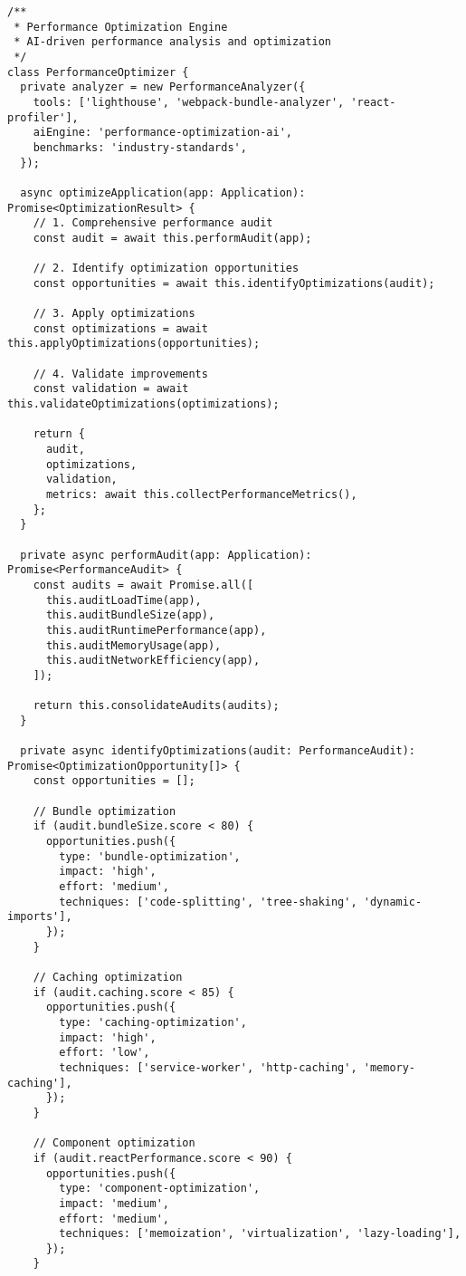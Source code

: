 \documentclass[11pt,a4paper]{article}
\begin{document}
\begin{lstlisting}[style=typescript, caption=AI-Powered Performance Optimization]
/**
 * Performance Optimization Engine
 * AI-driven performance analysis and optimization
 */
class PerformanceOptimizer {
  private analyzer = new PerformanceAnalyzer({
    tools: ['lighthouse', 'webpack-bundle-analyzer', 'react-profiler'],
    aiEngine: 'performance-optimization-ai',
    benchmarks: 'industry-standards',
  });

  async optimizeApplication(app: Application): Promise<OptimizationResult> {
    // 1. Comprehensive performance audit
    const audit = await this.performAudit(app);

    // 2. Identify optimization opportunities
    const opportunities = await this.identifyOptimizations(audit);

    // 3. Apply optimizations
    const optimizations = await this.applyOptimizations(opportunities);

    // 4. Validate improvements
    const validation = await this.validateOptimizations(optimizations);

    return {
      audit,
      optimizations,
      validation,
      metrics: await this.collectPerformanceMetrics(),
    };
  }

  private async performAudit(app: Application): Promise<PerformanceAudit> {
    const audits = await Promise.all([
      this.auditLoadTime(app),
      this.auditBundleSize(app),
      this.auditRuntimePerformance(app),
      this.auditMemoryUsage(app),
      this.auditNetworkEfficiency(app),
    ]);

    return this.consolidateAudits(audits);
  }

  private async identifyOptimizations(audit: PerformanceAudit): Promise<OptimizationOpportunity[]> {
    const opportunities = [];

    // Bundle optimization
    if (audit.bundleSize.score < 80) {
      opportunities.push({
        type: 'bundle-optimization',
        impact: 'high',
        effort: 'medium',
        techniques: ['code-splitting', 'tree-shaking', 'dynamic-imports'],
      });
    }

    // Caching optimization
    if (audit.caching.score < 85) {
      opportunities.push({
        type: 'caching-optimization',
        impact: 'high',
        effort: 'low',
        techniques: ['service-worker', 'http-caching', 'memory-caching'],
      });
    }

    // Component optimization
    if (audit.reactPerformance.score < 90) {
      opportunities.push({
        type: 'component-optimization',
        impact: 'medium',
        effort: 'medium',
        techniques: ['memoization', 'virtualization', 'lazy-loading'],
      });
    }


\end{lstlisting}
\end{document}
